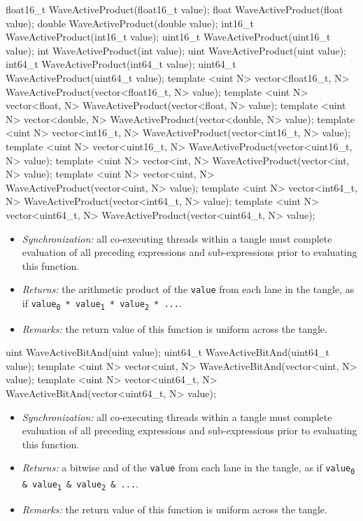 \begin{HLSL}
float16_t WaveActiveProduct(float16_t value);
float WaveActiveProduct(float value);
double WaveActiveProduct(double value);
int16_t WaveActiveProduct(int16_t value);
uint16_t WaveActiveProduct(uint16_t value);
int WaveActiveProduct(int value);
uint WaveActiveProduct(uint value);
int64_t WaveActiveProduct(int64_t value);
uint64_t WaveActiveProduct(uint64_t value);
template <uint N> vector<float16_t, N> WaveActiveProduct(vector<float16_t, N> value);
template <uint N> vector<float, N> WaveActiveProduct(vector<float, N> value);
template <uint N> vector<double, N> WaveActiveProduct(vector<double, N> value);
template <uint N> vector<int16_t, N> WaveActiveProduct(vector<int16_t, N> value);
template <uint N> vector<uint16_t, N> WaveActiveProduct(vector<uint16_t, N> value);
template <uint N> vector<int, N> WaveActiveProduct(vector<int, N> value);
template <uint N> vector<uint, N> WaveActiveProduct(vector<uint, N> value);
template <uint N> vector<int64_t, N> WaveActiveProduct(vector<int64_t, N> value);
template <uint N> vector<uint64_t, N> WaveActiveProduct(vector<uint64_t, N> value);
\end{HLSL}

\begin{itemize}
  \item \textit{Synchronization:} all co-executing threads within a \gls{tangle}
  must complete evaluation of all preceding expressions and sub-expressions
  prior to evaluating this function.
  \item \textit{Returns:} the arithmetic product of the \texttt{value} from each
  \gls{lane} in the \gls{tangle}, as if \texttt{value\textsubscript{0} *
  value\textsubscript{1} * value\textsubscript{2} * ...}.
  \item \textit{Remarks:} the return value of this function is uniform across
  the \gls{tangle}.
\end{itemize}

\begin{HLSL}
uint WaveActiveBitAnd(uint value);
uint64_t WaveActiveBitAnd(uint64_t value);
template <uint N> vector<uint, N> WaveActiveBitAnd(vector<uint, N> value);
template <uint N> vector<uint64_t, N> WaveActiveBitAnd(vector<uint64_t, N> value);
\end{HLSL}

\begin{itemize}
  \item \textit{Synchronization:} all co-executing threads within a \gls{tangle}
  must complete evaluation of all preceding expressions and sub-expressions
  prior to evaluating this function.
  \item \textit{Returns:} a bitwise and of the \texttt{value} from each
  \gls{lane} in the \gls{tangle}, as if \texttt{value\textsubscript{0} \&
  value\textsubscript{1} \& value\textsubscript{2} \& ...}.
  \item \textit{Remarks:} the return value of this function is uniform across
  the \gls{tangle}.
\end{itemize}


